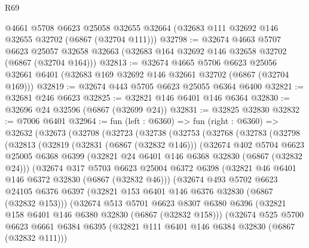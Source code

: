 \begin{lexlean}{R69}
\begin{coremodule}
{    @4661
    @5708
    @6623
    @25058
    @32655
    @32664
    (@32683 @111 @32692 @146 @32655 @32702 (@6867 (@32704 @111)))
@32798 := @32674
    @4663
    @5707
    @6623
    @25057
    @32658
    @32663
    (@32683 @164 @32692 @146 @32658 @32702 (@6867 (@32704 @164)))
@32813 := @32674
    @4665
    @5706
    @6623
    @25056
    @32661
    @6401
    (@32683 @169 @32692 @146 @32661 @32702 (@6867 (@32704 @169)))
@32819 := @32674 @443 @5705 @6623 @25055 @6364 @6400
@32821 := @32681 @246 @6623
@32825 := @32821 @146 @6401 @146 @6364
@32830 := @32696 @24 @32596 (@6867 (@32699 @24))
@32831 := @32825 @32830
@32832 := @7006 @6401
@32964 := fun (left : @6360) =>
  fun (right : @6360) =>
  @32632
    (@32673
      (@32708
        (@32723
          (@32738
            (@32753
              (@32768
                (@32783
                  (@32798
                    (@32813
                      (@32819
                        (@32831 (@6867 (@32832 @146)))
                        (@32674
                          @402
                          @5704
                          @6623
                          @25005
                          @6368
                          @6399
                          (@32821 @24 @6401 @146 @6368 @32830 (@6867 (@32832 @24)))
                          (@32674
                            @317
                            @5703
                            @6623
                            @25004
                            @6372
                            @6398
                            (@32821 @46 @6401 @146 @6372 @32830 (@6867 (@32832 @46)))
                            (@32674
                              @493
                              @5702
                              @6623
                              @24105
                              @6376
                              @6397
                              (@32821 @153 @6401 @146 @6376 @32830 (@6867 (@32832 @153)))
                              (@32674
                                @513
                                @5701
                                @6623
                                @8307
                                @6380
                                @6396
                                (@32821 @158 @6401 @146 @6380 @32830 (@6867 (@32832 @158)))
                                (@32674
                                  @525
                                  @5700
                                  @6623
                                  @6661
                                  @6384
                                  @6395
                                  (@32821 @111 @6401 @146 @6384 @32830 (@6867 (@32832 @111)))
}
\end{coremodule}
\end{lexlean}
